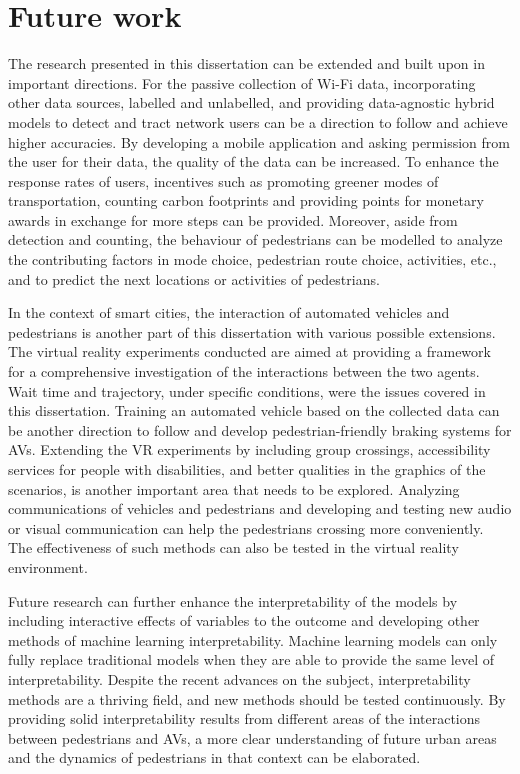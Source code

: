 \section{Future work}
\label{chap7:sec3}
The research presented in this dissertation can be extended and built upon in important directions. For the passive collection of Wi-Fi data, incorporating other data sources, labelled and unlabelled, and providing data-agnostic hybrid models to detect and tract network users can be a direction to follow and achieve higher accuracies. By developing a mobile application and asking permission from the user for their data, the quality of the data can be increased. To enhance the response rates of users, incentives such as promoting greener modes of transportation, counting carbon footprints and providing points for monetary awards in exchange for more steps can be provided. Moreover, aside from detection and counting, the behaviour of pedestrians can be modelled to analyze the contributing factors in mode choice, pedestrian route choice, activities, etc., and to predict the next locations or activities of pedestrians.

In the context of smart cities, the interaction of automated vehicles and pedestrians is another part of this dissertation with various possible extensions. The virtual reality experiments conducted are aimed at providing a framework for a comprehensive investigation of the interactions between the two agents. Wait time and trajectory, under specific conditions, were the issues covered in this dissertation. Training an automated vehicle based on the collected data can be another direction to follow and develop pedestrian-friendly braking systems for AVs. Extending the VR experiments by including group crossings, accessibility services for people with disabilities, and better qualities in the graphics of the scenarios, is another important area that needs to be explored. Analyzing communications of vehicles and pedestrians and developing and testing new audio or visual communication can help the pedestrians crossing more conveniently. The effectiveness of such methods can also be tested in the virtual reality environment. 

Future research can further enhance the interpretability of the models by including interactive effects of variables to the outcome and developing other methods of machine learning interpretability. Machine learning models can only fully replace traditional models when they are able to provide the same level of interpretability. Despite the recent advances on the subject, interpretability methods are a thriving field, and new methods should be tested continuously. By providing solid interpretability results from different areas of the interactions between pedestrians and AVs, a more clear understanding of future urban areas and the dynamics of pedestrians in that context can be elaborated.

